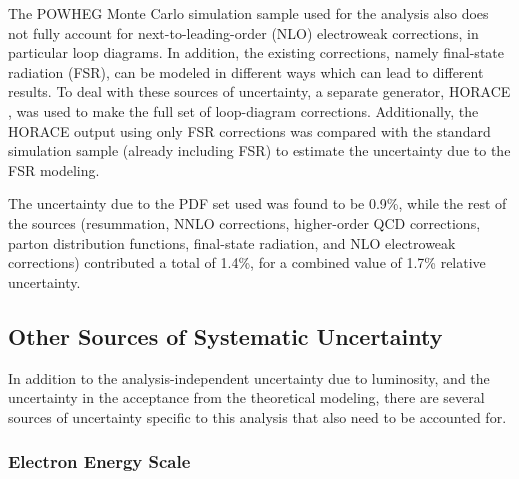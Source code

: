 
The POWHEG Monte Carlo simulation sample used for the analysis 
also does not fully account for next-to-leading-order (NLO) 
electroweak corrections, 
in particular loop diagrams.  
In addition, the existing corrections, 
namely final-state radiation (FSR), 
can be modeled in different ways 
which can lead to different results.  
To deal with these sources of uncertainty, 
a separate generator, HORACE \cite{horace1} \cite{horace2}, 
was used to make the full set of loop-diagram corrections.  
Additionally, the HORACE output using only FSR corrections 
was compared with the 
standard simulation sample 
(already including FSR) to estimate 
the uncertainty due to the FSR modeling.  



The uncertainty due to the PDF set used 
was found to be 0.9\%, 
while the rest of the sources 
(resummation, NNLO corrections, higher-order QCD corrections, 
parton distribution functions, 
final-state radiation, and NLO electroweak corrections) 
contributed a total of 1.4\%, 
for a combined value of 1.7\% relative uncertainty.  





\subsection{Other Sources of Systematic Uncertainty}
\label{anMeth:SystsOther}


In addition to the analysis-independent 
uncertainty due to luminosity, 
and the uncertainty in the acceptance 
from the theoretical modeling, 
there are several sources of 
uncertainty specific to this analysis 
that also need to be accounted for.  

\subsubsection{Electron Energy Scale}
\label{anMeth:SystsOtherEleEScale}

